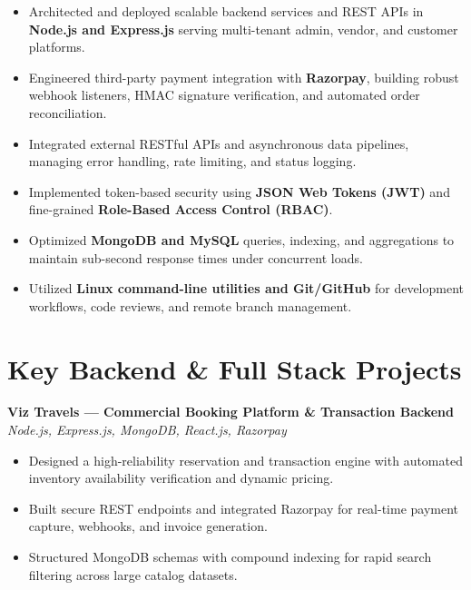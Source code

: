 \documentclass[a4paper,10pt]{article}
\begin{document}
\begin{itemize}

    \item Architected and deployed scalable backend services and REST APIs in \textbf{Node.js and Express.js} serving multi-tenant admin, vendor, and customer platforms.

    \item Engineered third-party payment integration with \textbf{Razorpay}, building robust webhook listeners, HMAC signature verification, and automated order reconciliation.

    \item Integrated external RESTful APIs and asynchronous data pipelines, managing error handling, rate limiting, and status logging.

    \item Implemented token-based security using \textbf{JSON Web Tokens (JWT)} and fine-grained \textbf{Role-Based Access Control (RBAC)}.

    \item Optimized \textbf{MongoDB and MySQL} queries, indexing, and aggregations to maintain sub-second response times under concurrent loads.

    \item Utilized \textbf{Linux command-line utilities and Git/GitHub} for development workflows, code reviews, and remote branch management.

\end{itemize}

\section*{Key Backend \& Full Stack Projects}

\textbf{Viz Travels --- Commercial Booking Platform \& Transaction Backend}
\hfill
\textit{Node.js, Express.js, MongoDB, React.js, Razorpay}

\begin{itemize}

    \item Designed a high-reliability reservation and transaction engine with automated inventory availability verification and dynamic pricing.

    \item Built secure REST endpoints and integrated Razorpay for real-time payment capture, webhooks, and invoice generation.

    \item Structured MongoDB schemas with compound indexing for rapid search filtering across large catalog datasets.

\end{itemize}
\end{document}
